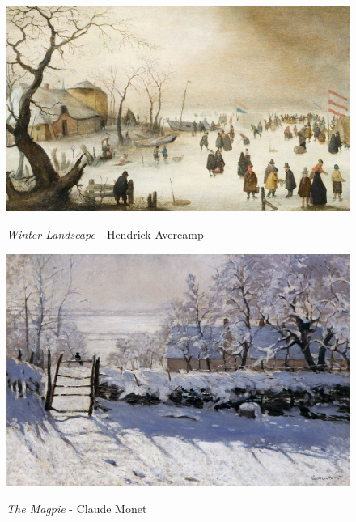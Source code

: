 \documentclass[a4paper]{article}
\begin{document}
\begin {figure}[h!]
\centering
\begin{minipage}[b]{.49\textwidth}
	\centering
	\includegraphics[width=\textwidth]{SnowPaintings/_Wth__Winter_Landscape_-_Hendrick_Avercamp.jpg}
    \caption{\emph{Winter Landscape} - Hendrick Avercamp}
\end{minipage}
\hfill
\begin{minipage}[b]{.49\textwidth}
	\centering
	\includegraphics[width=\textwidth]{SnowPaintings/_Wth__The_Magpie_-_Monet.jpg}
    \caption{\emph{The Magpie} - Claude Monet}
\end{minipage}
\end{figure}
\end{document}

